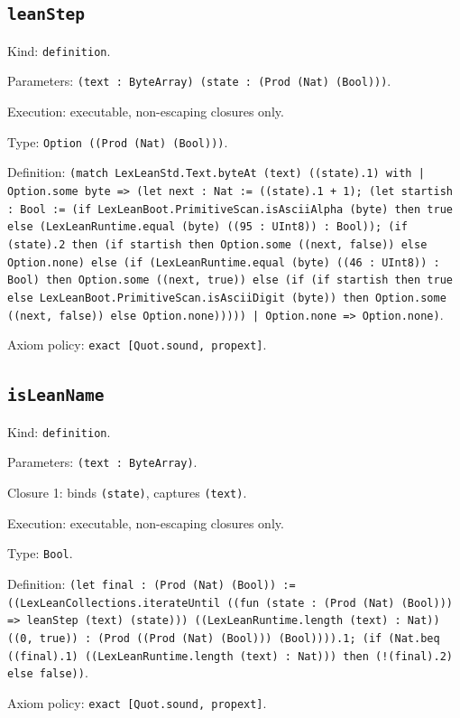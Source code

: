 \documentclass[11pt]{article}
\begin{document}
\subsection*{\texttt{leanStep}}
\noindent Kind: \texttt{definition}.\par
\noindent Parameters: \texttt{(text : ByteArray) (state : (Prod (Nat) (Bool)))}.\par
\noindent Execution: executable, non-escaping closures only.\par
\noindent Type: \texttt{Option ((Prod (Nat) (Bool)))}.\par
\noindent Definition: \texttt{(match LexLeanStd.Text.byteAt (text) ((state).1) with | Option.some byte => (let next : Nat := ((state).1 + 1); (let startish : Bool := (if LexLeanBoot.PrimitiveScan.isAsciiAlpha (byte) then true else (LexLeanRuntime.equal (byte) ((95 : UInt8)) : Bool)); (if (state).2 then (if startish then Option.some ((next, false)) else Option.none) else (if (LexLeanRuntime.equal (byte) ((46 : UInt8)) : Bool) then Option.some ((next, true)) else (if (if startish then true else LexLeanBoot.PrimitiveScan.isAsciiDigit (byte)) then Option.some ((next, false)) else Option.none))))) | Option.none => Option.none)}.\par
\noindent Axiom policy: \texttt{exact [Quot.sound, propext]}.\par
\subsection*{\texttt{isLeanName}}
\noindent Kind: \texttt{definition}.\par
\noindent Parameters: \texttt{(text : ByteArray)}.\par
\noindent Closure 1: binds \texttt{(state)}, captures \texttt{(text)}.\par
\noindent Execution: executable, non-escaping closures only.\par
\noindent Type: \texttt{Bool}.\par
\noindent Definition: \texttt{(let final : (Prod (Nat) (Bool)) := ((LexLeanCollections.iterateUntil ((fun (state : (Prod (Nat) (Bool))) => leanStep (text) (state))) ((LexLeanRuntime.length (text) : Nat)) ((0, true)) : (Prod ((Prod (Nat) (Bool))) (Bool)))).1; (if (Nat.beq ((final).1) ((LexLeanRuntime.length (text) : Nat))) then (!(final).2) else false))}.\par
\noindent Axiom policy: \texttt{exact [Quot.sound, propext]}.\par
\end{document}
